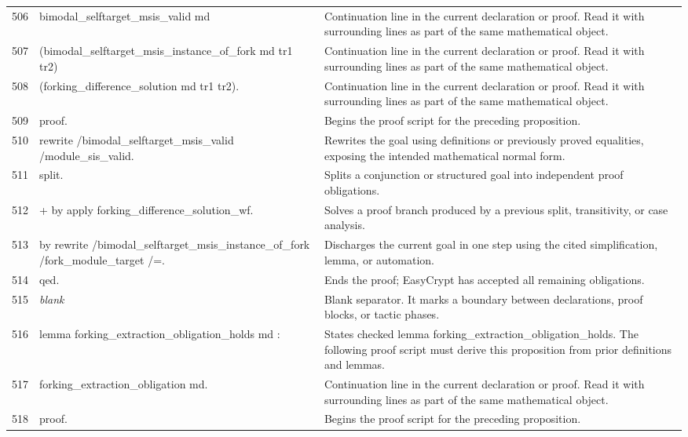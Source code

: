 \documentclass[10pt]{article}
\begin{document}
\begin{longtable}{r L{0.53\textwidth} L{0.37\textwidth}}
506 & {\ttfamily\scriptsize   bimodal\_selftarget\_msis\_valid md} & Continuation line in the current declaration or proof.  Read it with surrounding lines as part of the same mathematical object. \\
507 & {\ttfamily\scriptsize     (bimodal\_selftarget\_msis\_instance\_of\_fork md tr1 tr2)} & Continuation line in the current declaration or proof.  Read it with surrounding lines as part of the same mathematical object. \\
508 & {\ttfamily\scriptsize     (forking\_difference\_solution md tr1 tr2).} & Continuation line in the current declaration or proof.  Read it with surrounding lines as part of the same mathematical object. \\
509 & {\ttfamily\scriptsize proof.} & Begins the proof script for the preceding proposition. \\
510 & {\ttfamily\scriptsize rewrite /bimodal\_selftarget\_msis\_valid /module\_sis\_valid.} & Rewrites the goal using definitions or previously proved equalities, exposing the intended mathematical normal form. \\
511 & {\ttfamily\scriptsize split.} & Splits a conjunction or structured goal into independent proof obligations. \\
512 & {\ttfamily\scriptsize + by apply forking\_difference\_solution\_wf.} & Solves a proof branch produced by a previous split, transitivity, or case analysis. \\
513 & {\ttfamily\scriptsize by rewrite /bimodal\_selftarget\_msis\_instance\_of\_fork /fork\_module\_target /=.} & Discharges the current goal in one step using the cited simplification, lemma, or automation. \\
514 & {\ttfamily\scriptsize qed.} & Ends the proof; EasyCrypt has accepted all remaining obligations. \\
515 & {\ttfamily\scriptsize \emph{blank}} & Blank separator.  It marks a boundary between declarations, proof blocks, or tactic phases. \\
516 & {\ttfamily\scriptsize lemma forking\_extraction\_obligation\_holds md :} & States checked lemma forking\_extraction\_obligation\_holds.  The following proof script must derive this proposition from prior definitions and lemmas. \\
517 & {\ttfamily\scriptsize   forking\_extraction\_obligation md.} & Continuation line in the current declaration or proof.  Read it with surrounding lines as part of the same mathematical object. \\
518 & {\ttfamily\scriptsize proof.} & Begins the proof script for the preceding proposition. \\

\end{longtable}
\end{document}
